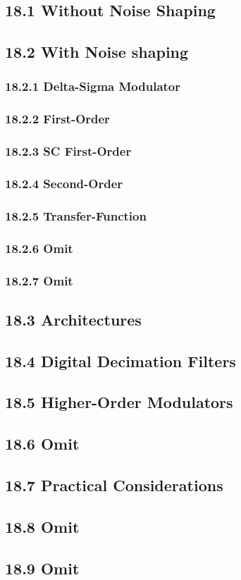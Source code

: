\subsection{18.1 Without Noise Shaping}
\subsection{18.2 With Noise shaping}
  \subsubsection{18.2.1 Delta-Sigma Modulator}
  \subsubsection{18.2.2 First-Order}
  \subsubsection{18.2.3 SC First-Order}
  \subsubsection{18.2.4 Second-Order}
  \subsubsection{18.2.5 Transfer-Function}
  \subsubsection{18.2.6 Omit}
  \subsubsection{18.2.7 Omit}
\subsection{18.3 Architectures}
\subsection{18.4 Digital Decimation Filters}
\subsection{18.5 Higher-Order Modulators}
\subsection{18.6 Omit}
\subsection{18.7 Practical Considerations}
\subsection{18.8 Omit}
\subsection{18.9 Omit}
